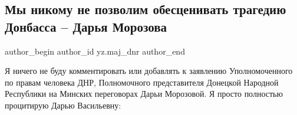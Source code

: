  
 
 
 
 
 
\subsection{Мы никому не позволим обесценивать трагедию Донбасса – Дарья Морозова}
\label{sec:17_02_2022.yz.maj_dnr.1.tragedia_donbass_darja_morozova}
 
\ifcmt
 author_begin
   author_id yz.maj_dnr
 author_end
\fi


Я ничего не буду комментировать или добавлять к заявлению Уполномоченного по
правам человека ДНР, Полномочного представителя Донецкой Народной Республики на
Минских переговорах Дарьи Морозовой. Я просто полностью процитирую Дарью
Васильевну:

